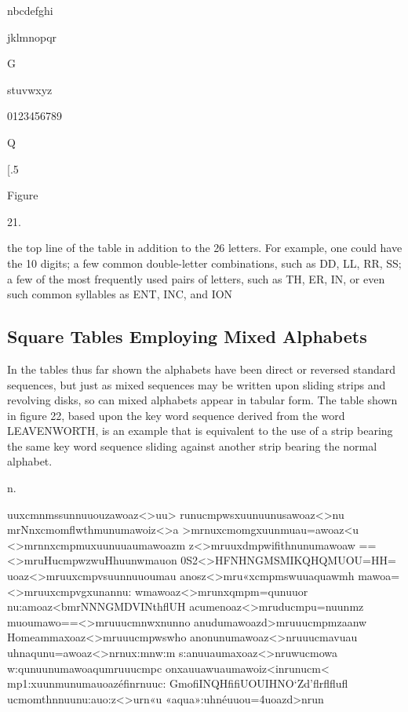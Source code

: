 nbcdefghi

 

 

jklmnopqr

 

G

 

 

stuvwxyz

 

0123456789

 

Q

 

 

[.5

Figure

21.


the top line of the table in addition to the 26 letters. For example, one
could have the 10 digits; a few common double-letter combinations, such
as DD, LL, RR, SS; a few of the most frequently used pairs of letters,
such as TH, ER, IN, or even such common syllables as ENT, INC, and
ION

\subsection{Square Tables Employing Mixed Alphabets}

\mypara In the tables thus far shown the alphabets have been direct or
reversed standard sequences, but just as mixed sequences may be written
upon sliding strips and revolving disks, so can mixed alphabets appear in
tabular form. The table shown in ﬁgure 22, based upon the key word
sequence derived from the word LEAVENWORTH, is an example that
is equivalent to the use of a strip bearing the same key word sequence
sliding against another strip bearing the normal alphabet.

n.

uuxcmnmssunnuuouzawoaz<>uu>
runucmpwsxuunuunusawoaz<>nu
mrNnxcmomﬂwthmunumawoiz<>a
>mrnuxcmomgxuunmuau=awoaz<u
<>mrnnxcmpmuxuunuuaumawoazm
z<>mruuxdmpwiﬁthnunumawoaw
==<>mruHucmpwzwuHhuunwmauon
0S2<>HFNHNGMSMIKQHQMUOU=HH=
uoaz<>mruuxcmpvsuunnuuoumau
anosz<>mru«xcmpmswuuaquawmh
mawoa=<>mruuxcmpvgxunannu:
wmawoaz<>mrunxqmpm=qunuuor
nu:amoaz<bmrNNNGMDVINthﬂUH
acumenoaz<>mruducmpu=nuunmz
muoumawo==<>mruuucmnwxnunno
anudumawoazd>mruuucmpmzaanw
Homeammaxoaz<>mruuucmpwswho
anonunumawoaz<>nruuucmavuau
uhnaqunu=awoaz<>nrnux:mnw:m
s:anuuaumaxoaz<>nruwucmowa
w:qunuunumawoaqumruuucmpc
onxauuawuaumawoiz<inrunucm<
mp1:xuunmunumauoazéﬁnrnuuc:
GmoﬁINQHﬁﬁUOUIHNO‘Zd’ﬂrﬂﬂuﬂ
ucmomthnnuunu:auo:z<>urn«u
«aqua»:uhnéuuou=4uoazd>nrun

